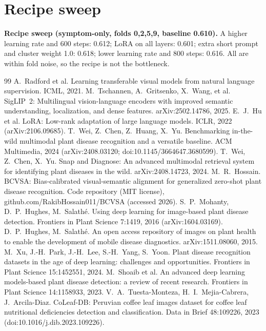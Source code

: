 \documentclass[11pt]{article}
\begin{document}
\appendix
\section{Recipe sweep}\label{app:recipe}
\textbf{Recipe sweep (symptom-only, folds 0,2,5,9, baseline 0.610).} A higher learning rate and 600 steps: 0.612; LoRA on all layers: 0.601; extra short prompt and cluster weight 1.0: 0.618; lower learning rate and 800 steps: 0.616. All are within fold noise, so the recipe is not the bottleneck.

\begin{thebibliography}{99}
 A.~Radford et al. Learning transferable visual models from natural language supervision. ICML, 2021.
 M.~Tschannen, A.~Gritsenko, X.~Wang, et al. SigLIP~2: Multilingual vision-language encoders with improved semantic understanding, localization, and dense features. arXiv:2502.14786, 2025.
 E.~J.~Hu et al. LoRA: Low-rank adaptation of large language models. ICLR, 2022 (arXiv:2106.09685).
 T.~Wei, Z.~Chen, Z.~Huang, X.~Yu. Benchmarking in-the-wild multimodal plant disease recognition and a versatile baseline. ACM Multimedia, 2024 (arXiv:2408.03120; doi:10.1145/3664647.3680599).
 T.~Wei, Z.~Chen, X.~Yu. Snap and Diagnose: An advanced multimodal retrieval system for identifying plant diseases in the wild. arXiv:2408.14723, 2024.
 M.~R.~Hossain. BCVSA: Bias-calibrated visual-semantic alignment for generalized zero-shot plant disease recognition. Code repository (MIT license), github.com/RakibHossain011/BCVSA (accessed 2026).
 S.~P.~Mohanty, D.~P.~Hughes, M.~Salath\'e. Using deep learning for image-based plant disease detection. Frontiers in Plant Science 7:1419, 2016 (arXiv:1604.03169).
 D.~P.~Hughes, M.~Salath\'e. An open access repository of images on plant health to enable the development of mobile disease diagnostics. arXiv:1511.08060, 2015.
 M.~Xu, J.-H.~Park, J.-H.~Lee, S.-H.~Yang, S.~Yoon. Plant disease recognition datasets in the age of deep learning: challenges and opportunities. Frontiers in Plant Science 15:1452551, 2024.
 M.~Shoaib et al. An advanced deep learning models-based plant disease detection: a review of recent research. Frontiers in Plant Science 14:1158933, 2023.
 V.~A.~Tuesta-Monteza, H.~I.~Mejia-Cabrera, J.~Arcila-Diaz. CoLeaf-DB: Peruvian coffee leaf images dataset for coffee leaf nutritional deficiencies detection and classification. Data in Brief 48:109226, 2023 (doi:10.1016/j.dib.2023.109226).

\end{thebibliography}
\end{document}
